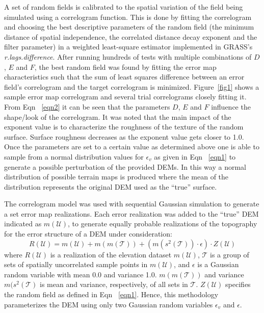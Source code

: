 \documentclass[12pt]{article}
\begin{document}
A set of random fields is calibrated to the spatial variation of the
field being simulated using a correlogram function. This is done by
fitting the correlogram and choosing the best descriptive parameters
of the random field (the minimum distance of spatial independence, the
correlated distance decay exponent and the filter parameter) in a
weighted least-square estimator implemented in GRASS's
\textit{r.lags.difference}.  After running hundreds of tests with
multiple combinations of $D$, $E$ and $F$, the best random field was 
found by fitting the error map characteristics such that the sum of
least squares difference between an error field's correlogram and the
target correlogram is minimized.
Figure~\ref{fig1} shows a sample error map correlogram and several
trial correlograms closely fitting it.  From Eqn ~\ref{eqn2} it can be
seen that the parameters $D$, $E$ and $F$ influence the shape/look of
the correlogram.  It was noted that the main impact of the exponent value
is to characterize the roughness of the texture of the random
surface. Surface roughness decreases as the exponent value gets
closer to 1.0.  Once the parameters are set to a certain value as
determined above one is able to sample from a normal distribution
values for $\epsilon_v$ as given in Eqn ~\ref{eqn1} to generate a
possible perturbation of the provided DEMs. In this way a normal
distribution of possible terrain maps is produced where the mean of
the distribution represents the original DEM used as the ``true''
surface.

The correlogram model was used with sequential Gaussian simulation to
generate a set error map realizations.  Each error realization was added
to the ``true'' DEM indicated as $m(\mathcal{U})$, to generate equally probable realizations of the
topography for the error structure of a DEM under consideration:
\begin{equation}
 R(\mathcal{U})=m(\mathcal{U})+m(m(\mathcal{T}))+(m(s^2(\mathcal{T}))\cdot \epsilon)\cdot Z(\mathcal{U})
\label{eq:one}
\end{equation} 
where $R(\mathcal{U})$ is a realization of the elevation dataset $m(\mathcal{U})$, $\mathcal{T}$ is a
group of sets of spatially uncorrelated sample points in $m(\mathcal{U})$, and $\epsilon$
is a Gaussian random variable with mean 0.0 and variance 1.0. $m(m(\mathcal{T}))$ and
variance $m(s^2(\mathcal{T})$ is mean and variance, respectively, of all sets in 
$\mathcal{T}$. $Z(\mathcal{U})$ specifies the random field as
defined in Eqn ~\ref{eqn1}. Hence, this methodology parameterizes the DEM
using only two Gaussian random variables $\epsilon_v$ and $\epsilon$.
\end{document}
